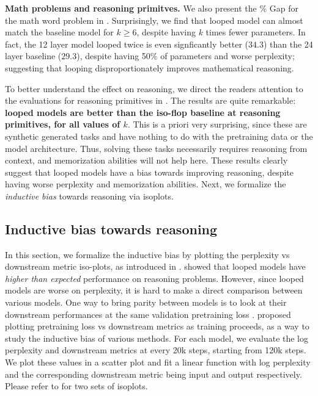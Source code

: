 



\textbf{Math problems and reasoning primitves.} We also present the \% Gap for the math word problem in . Surprisingly, we find that  looped model can almost match the baseline  model for $k\ge6$, despite having $k$ times fewer parameters. In fact, the 12 layer model looped twice is even signficantly better ($34.3$) than the 24 layer baseline ($29.3$), despite having 50\% of parameters and worse perplexity; suggesting that looping disproportionately improves mathematical reasoning. 

To better understand the effect on reasoning, we direct the readers attention to the evaluations for reasoning primitives in . The results are quite remarkable: {\bf {} looped models are better than the iso-flop baseline  at reasoning primitives, for all values of $k$}.
This is a priori very surprising, since these are synthetic generated tasks and have nothing to do with the pretraining data or the model architecture.
Thus, solving these tasks necessarily requires reasoning from context, and memorization abilities will not help here.
These results clearly suggest that looped models have a bias towards improving reasoning, despite having worse perplexity and memorization abilities. Next, we formalize the {\em inductive bias} towards reasoning via isoplots.
\vspace{-0.1in}

\subsection{Inductive bias towards reasoning}
\label{sec:inductive_bias}



In this section, we formalize the inductive bias by plotting the perplexity vs downstream metric iso-plots, as introduced in \citet{saunshi22understanding}.
 showed that looped models have {\em higher than expected} performance on reasoning problems.
However, since looped models are worse on perplexity, it is hard to make a direct comparison between various models.
One way to bring parity between models is to look at their downstream performances at the same validation pretraining loss \citep{liu2023same}.
\citet{saunshi2024inductive} proposed plotting pretraining loss vs downstream metrics as training proceeds, as a way to study the inductive bias of various methods.
For each model, we evaluate the log perplexity and downstream metrics at every 20k steps, starting from 120k steps. We plot these values in a scatter plot and fit a linear function with log perplexity and the corresponding downstream metric being input and output respectively.
Please refer to  for two sets of isoplots.

